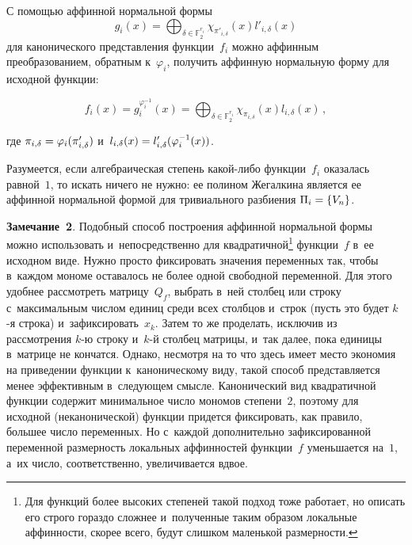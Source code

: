 \begin{multicols}{2}
С помощью аффинной нормальной формы
$$
g_i(x)=\bigoplus_{\delta\in\mathbb{F}_2^{r_i}} 
\chi_{\pi'_{i,\delta}}(x)l'_{i,\delta}(x)
$$
для канонического представления функции~$f_i$ можно аффинным преобразованием, 
обратным к~$\varphi_i$, получить аффинную нормальную форму для исходной функции:

\vspace*{1pt}

\noindent
$$
f_i(x)=g_i^{\varphi_i^{-1}}(x) = \bigoplus_{\delta\in\mathbb{F}_2^{r_i}} 
\chi_{\pi_{i,\delta}}(x)l_{i,\delta}(x)\,,
$$

\vspace*{-3pt}

\noindent
где $\pi_{i,\delta}\hm=\varphi_i(\pi'_{i,\delta})$ 
и~$l_{i,\delta}(x)\hm=l'_{i,\delta}(\varphi_i^{-1}(x))$.

Разумеется, если алгебраическая степень какой-либо функции~$f_i$ оказалась 
равной~$1$, то искать ничего не нужно: ее полином Жегалкина является ее аффинной 
нормальной формой для тривиального разбиения $\Pi_i\hm=\{V_n\}$.

\smallskip

\noindent
\textbf{Замечание~2}.
    Подобный способ построения аффинной нормальной формы можно использовать 
    и~непосредственно для квадратичной\footnote{Для функций более высоких степеней 
такой подход тоже работает, но описать его строго гораздо сложнее и~полученные 
таким образом локальные аффинности, скорее всего, будут слишком маленькой 
размерности.} функции~$f$ в~ее исходном виде. Нужно просто фиксировать значения 
переменных так, чтобы в~каждом мономе оставалось не более одной свободной 
переменной. Для этого удобнее рассмотреть матрицу~$Q_f$, выбрать в~ней столбец 
или строку с~максимальным числом единиц среди всех столбцов и~строк (пусть это 
будет $k$-я строка) и~зафиксировать~$x_k$. Затем то же проделать, исключив из 
рассмотрения $k$-ю строку и~$k$-й столбец матрицы, и~так далее, пока единицы 
в~матрице не кончатся.
Однако, несмотря на то что здесь имеет место экономия на приведении функции 
к~каноническому виду, такой способ представляется менее эффективным в~следующем 
смысле. Канонический вид квадратичной функции содержит минимальное число мономов 
степени~$2$, поэтому для исходной (неканонической) функции придется фиксировать, 
как правило, большее число переменных. Но с~каждой дополнительно зафиксированной 
переменной размерность локальных аффинностей функции~$f$ уменьшается на~$1$, 
а~их число, соответственно, увеличивается вдвое.

\vspace*{-4pt}



\end{multicols}
